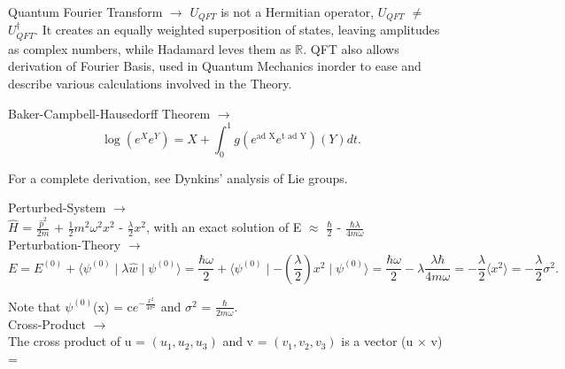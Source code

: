 \documentclass[a4paper, 10pt, onepage]{elegantbook}
\begin{document}
{\begin{remark}  
Quantum Fourier Transform $\rightarrow$ $U_{QFT}$ is not a Hermitian operator,
$U_{QFT}$ $\neq$ $U_{QFT}^{\dagger}$. It creates an equally weighted superposition of states, leaving amplitudes as complex numbers,
while Hadamard leves them as $\mathbb R$. QFT also allows derivation of Fourier Basis, used in Quantum Mechanics inorder to ease and describe  various calculations involved in the Theory.
\end{remark}

Baker-Campbell-Hausedorff Theorem $\rightarrow$ \\
\label{eq:Baker-Campbell-Hausedorff Theorem}
\begin{equation}
\log(e^Xe^Y) = X + \int_{0}^1 g(e^{\text{ad X}} e^{\text{t ad Y}})(Y)dt.
\end{equation}

For a complete derivation, see Dynkins' analysis of Lie groups.

Perturbed-System $\rightarrow$  \\

$\hat H$ = $\frac{\hat p^2}{2m}$ + $\frac{1}{2} m^2 \omega^2 x^2$ - $\frac{\lambda}{2} x^2$,  
with an exact solution of E $\approx$ $\frac{\hbar}{2}$ - $\frac{\hbar \lambda}{4m \omega}$  \\

Perturbation-Theory $\rightarrow$ \\
\begin{equation}
E = E^{(0)} + \langle \psi^{(0)} \mid \lambda \hat w \mid \psi^{(0)} \rangle = \frac{\hbar \omega}{2} + \langle \psi^{(0)} \mid {-(\frac{\lambda}{2}) x^2} \mid  \psi^{(0)} \rangle =  \frac{\hbar \omega}{2} - \lambda \frac{\lambda \hbar}{4m \omega} =  - \frac{\lambda}{2} \langle x^2 \rangle =  - \frac{\lambda}{2} \sigma^2.
\end{equation}

Note that $\psi^{(0)}$(x) = c$e^{- \frac{x^2}{4 \sigma^2}}$ and $\sigma^2$ = $\frac{\hbar}{2m \omega}$.  \\

Cross-Product $\rightarrow$ \\ 
    
The cross product of u = $(u_1,u_2,u_3)$ and v = $(v_1,v_2,v_3)$ is a vector                                                                                            
(u $\times$ v) = \\

}
\end{document}

